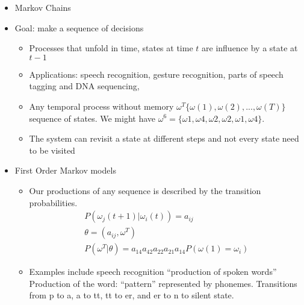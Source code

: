 \documentclass[11pt]{article}
\begin{document}
\begin{itemize}
	\item Markov Chains
	\item Goal: make a sequence of decisions
	\begin{itemize}
		\item Processes that unfold in time, states at time $t$ are influence by a state at $t-1$
		\item Applications: speech recognition, gesture recognition, parts of speech tagging and DNA sequencing, 
		\item Any temporal process without memory $\omega ^T \{ \omega(1),\omega(2), ..., \omega(T) \}$ sequence of states.  We might have $\omega^6 = \{ \omega 1, \omega 4, \omega 2, \omega 2, \omega 1, \omega 4  \}$.
		\item The system can revisit a state at different steps and not every state need to be visited 
	\end{itemize}
	\item First Order Markov models
	\begin{itemize}
		\item Our productions of any sequence is described by the transition probabilities. 
		\begin{eqnarray}
			P( \omega_j (t+1) | \omega_i (t)) = a_{ij} \\
			\theta = ( a_ {ij} , \omega^T) \\
			P(\omega^T | \theta) = a_{14} a_{42} a_{22} a_{21} a_{14} P(\omega(1) = \omega_i)
		\end{eqnarray}
		\item Examples include speech recognition
		``production of spoken words''  Production of the word: ``pattern'' represented by phonemes.
		Transitions from p to a, a to tt, tt to er, and er to n to silent state.  
	\end{itemize}
	
\end{itemize}
\end{document}
